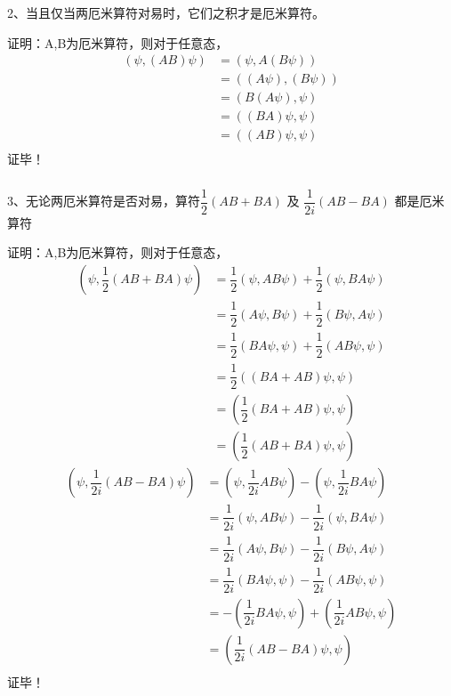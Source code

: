 \begin{frame} [allowframebreaks=]
    \frametitle{}
    \begin{exampleblock}{}
        2、当且仅当两厄米算符对易时，它们之积才是厄米算符。
    \end{exampleblock}
    \alert{证明：}A,B为厄米算符，则对于任意态，
    \begin{equation*}
        \begin{split}
            (\psi, (AB)\psi ) &= (\psi, A(B\psi) ) \\  
            &=((A \psi), (B\psi) )  \\
            &=(B(A \psi), \psi )  \\
            &=( (BA) \psi, \psi )  \\
            &=( (AB) \psi, \psi )  \\
         \end{split}
    \end{equation*}  
    证毕！
\end{frame}  

\begin{frame} [allowframebreaks=]
    \frametitle{}
    \begin{exampleblock}{}
        3、无论两厄米算符是否对易，算符$\dfrac{1}{2}(AB+BA)$ 及 $\dfrac{1}{2i}(AB-BA) $ 都是厄米算符
    \end{exampleblock}
    \alert{证明：}A,B为厄米算符，则对于任意态，
    \begin{equation*}
        \begin{split}
            (\psi, \dfrac{1}{2}(AB+BA)\psi ) &=\dfrac{1}{2}(\psi, AB\psi) + \dfrac{1}{2}(\psi, BA\psi)  \\
            &=\dfrac{1}{2}(A\psi, B\psi) + \dfrac{1}{2}(B\psi, A\psi)  \\
            &=\dfrac{1}{2}(BA\psi, \psi) + \dfrac{1}{2}(AB\psi, \psi)  \\
            &=\dfrac{1}{2}((BA+AB)\psi, \psi) \\
            &=(\dfrac{1}{2}(BA+AB)\psi, \psi) \\
            &=(\dfrac{1}{2}(AB+BA)\psi, \psi) 
         \end{split}
    \end{equation*}  
    \begin{equation*}
        \begin{split}
            (\psi, \dfrac{1}{2i}(AB-BA)\psi ) &= (\psi, \dfrac{1}{2i}AB\psi) - (\psi, \dfrac{1}{2i}BA\psi)\\  
            &=\dfrac{1}{2i}(\psi, AB\psi) - \dfrac{1}{2i}(\psi, BA\psi)  \\
            &=\dfrac{1}{2i}(A\psi, B\psi) - \dfrac{1}{2i}(B\psi, A\psi)  \\
            &=\dfrac{1}{2i}(BA\psi, \psi) - \dfrac{1}{2i}(AB\psi, \psi)  \\
            &=-(\dfrac{1}{2i}BA\psi, \psi) +(\dfrac{1}{2i}AB\psi, \psi)  \\
            &=(\dfrac{1}{2i}(AB-BA)\psi, \psi) \\
         \end{split}
    \end{equation*}  
    证毕！
\end{frame}  


